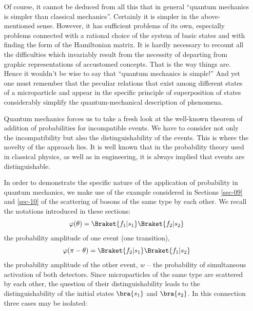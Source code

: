 \documentclass[a4paper,sfsidenotes,colorlinks=true]{tufte-book}
\numberwithin{equation}{section}
\numberwithin{figure}{section}
\begin{document}
Of course, it cannot be deduced from all this that in general
``quantum mechanics is simpler than classical mechanics''. Certainly
it is simpler in the above-mentioned sense. However, it has sufficient
problems of its own, especially problems connected with a rational
choice of the system of basic states and with finding the form of the
Hamiltonian matrix. It is hardly necessary to recount all the
difficulties which invariably result from the necessity of departing
from graphic representations of accustomed concepts. That is the way
things are. Hence it wouldn't be wise to say that ``quantum mechanics
is simple!'' And yet one must remember that the peculiar relations
that exist among different states of a microparticle and appear in the
specific principle of superposition of states considerably simplify
the quantum-mechanical description of phenomena.


Quantum mechanics forces
us to take a fresh look at the well-known theorem of addition of
probabilities for incompatible events. We have to consider not only
the incompatibility but also the distinguishability of the
events. This is where the novelty of the approach lies. It is well
known that in the probability theory used in classical physics, as
well as in engineering, it is always implied that events are
distinguishable.


In order to demonstrate the specific nature of the application of
probability in quantum mechanics, we make use of the example
considered in Sections \ref{sec-09} and \ref{sec-10} of the scattering
of bosons of the same type by each other. We recall the notations
introduced in these sections: 
\begin{equation*}
\varphi(\theta) = \Braket{f_{1} | s_{1}}\Braket{f_{2} | s_{2}}
\end{equation*}
the  probability amplitude of one event (one transition), 
\begin{equation*}
\varphi(\pi - \theta) = \Braket{f_{2} | s_{1}}\Braket{f_{1} | s_{2}}
\end{equation*}
the probability amplitude of the other event, $w$ -- the probability
of simultaneous activation of both detectors. Since microparticles of
the same type are scattered by each other, the question of their
distinguishability leads to the distinguishability of the initial
states $\bra{s_{1}}$ and $\bra{s_{2}}$. In this connection three cases
may be isolated:
\end{document}
